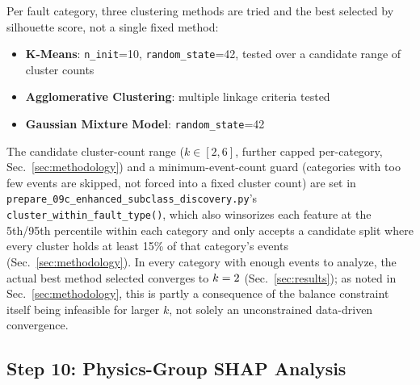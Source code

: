Per fault category, three clustering methods are tried and the best selected by silhouette score, not a single fixed method:
\begin{itemize}
    \item \textbf{K-Means}: \texttt{n\_init}=10, \texttt{random\_state}=42, tested over a candidate range of cluster counts  %
    \item \textbf{Agglomerative Clustering}: multiple linkage criteria tested
    \item \textbf{Gaussian Mixture Model}: \texttt{random\_state}=42  %
\end{itemize}
The candidate cluster-count range ($k \in [2,6]$, further capped per-category, Sec.~\ref{sec:methodology}) and a minimum-event-count guard (categories with too few events are skipped, not forced into a fixed cluster count) are set in \texttt{prepare\_09c\_enhanced\_subclass\_discovery.py}'s \texttt{cluster\_within\_fault\_type()}, which also winsorizes each feature at the 5th/95th percentile within each category and only accepts a candidate split where every cluster holds at least 15\% of that category's events (Sec.~\ref{sec:methodology}). %
In every category with enough events to analyze, the actual best method selected converges to $k=2$ (Sec.~\ref{sec:results}); as noted in Sec.~\ref{sec:methodology}, this is partly a consequence of the balance constraint itself being infeasible for larger $k$, not solely an unconstrained data-driven convergence.

\subsection{Step 10: Physics-Group SHAP Analysis}  %

